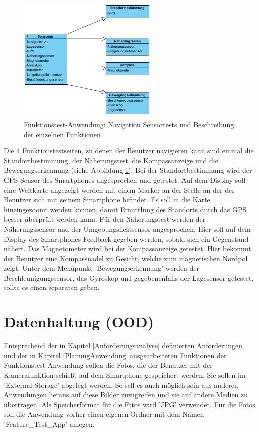 \begin{figure}[h]
	\centering
	\includegraphics[width=0.6\textwidth]{Bilder/Diagram_2.PNG}
	\caption{Funktionstest-Anwendung: Navigation Sensortests und Beschreibung der einzelnen Funktionen}
	\label{fig:Diagram_2}
\end{figure}
\clearpage
Die 4 Funktionstestseiten, zu denen der Benutzer navigieren kann sind einmal die Standortbestimmung, der Näherungstest, die Kompassanzeige und die Bewegungserkennung (siehe Abbildung \ref{fig:Diagram_2}). Bei der Standortbestimmung wird der GPS-Sensor des Smartphones angesprochen und getestet. Auf dem Display soll eine Weltkarte angezeigt werden mit einem Marker an der Stelle an der der Benutzer sich mit seinem Smartphone befindet. Es soll in die Karte hineingezoomt werden können, damit Ermittlung des Standorts durch das GPS besser überprüft werden kann. Für den Näherungstest werden der Näherungssensor und der Umgebungslichtsensor angesprochen. Hier soll auf dem Display des Smartphones Feedback gegeben werden, sobald sich ein Gegenstand nähert. Das Magnetometer wird bei der Kompassanzeige getestet. Hier bekommt der Benutzer eine Kompassnadel zu Gesicht, welche zum magnetischen Nordpol zeigt. Unter dem Menüpunkt 'Bewegungserkennung' werden der Beschleunigungssensor, das Gyroskop und gegebenenfalls der Lagesensor getestet, sollte es einen separaten geben. 

\section{Datenhaltung (OOD)}

Entsprechend der in Kapitel \ref{Anforderungsanalyse} definierten Anforderungen und der in Kapitel \ref{PlanungAnwendung} ausgearbeiteten Funktionen der Funktionstest-Anwendung sollen die Fotos, die der Benutzer mit der Kamerafunktion schießt auf dem Smartphone gespeichert werden. Sie sollen im 'External Storage' abgelegt werden. So soll es auch möglich sein aus anderen Anwendungen heraus auf diese Bilder zuzugreifen und sie auf andere Medien zu übertragen. Als Speicherformat für die Fotos wird 'JPG' verwendet. Für die Fotos soll die Anwendung vorher einen eigenen Ordner mit dem Namen 'Feature\_Test\_App' anlegen.


